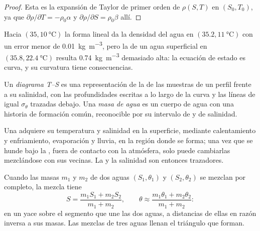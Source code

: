\begin{proof}
Esta es la expansión de Taylor de primer orden de $\rho(S, T)$ en $(S_0, T_0)$, ya que
$\partial\rho/\partial T = -\rho_0\alpha$ y $\partial\rho/\partial S =
\rho_0\beta$ allí.
\end{proof}

Hacia $(35, \qty{10}{\celsius})$ la forma lineal da la densidad del agua en $(35.2, \qty{11}{\celsius})$ con un error menor de \qty{0.01}{kg.m^{-3}}, pero la de un agua superficial en $(35.8, \qty{22.4}{\celsius})$ resulta \qty{0.74}{kg.m^{-3}} demasiado alta: la ecuación de estado es curva, y su curvatura tiene consecuencias.

\begin{definition}\label{def:b1:fluid-envelopes-structure:ts-diagram}
Un \emph{diagrama T--S} es una representación de la  de las muestras de un perfil frente a su salinidad, con las profundidades escritas a lo largo de la curva y las líneas de igual $\sigma_\theta$ trazadas debajo. Una \emph{masa de agua} es un cuerpo de agua con una historia de formación común, reconocible por su intervalo de  y de salinidad.
\end{definition}

Una  adquiere su temperatura y salinidad en la superficie, mediante calentamiento y enfriamiento, evaporación y lluvia, en la región donde se forma; una vez que se hunde bajo la , fuera de contacto con la atmósfera, solo puede cambiarlas mezclándose con sus vecinas. La  y la salinidad son entonces trazadores.

\begin{proposition}\label{prop:b1:fluid-envelopes-structure:mixing}
Cuando las masas $m_1$ y $m_2$ de dos aguas $(S_1, \theta_1)$ y $(S_2, \theta_2)$ se mezclan por completo, la mezcla tiene
\[
  S = \frac{m_1 S_1 + m_2 S_2}{m_1 + m_2},\qquad
  \theta \approx \frac{m_1 \theta_1 + m_2 \theta_2}{m_1 + m_2}:
\]
en un  yace sobre el segmento que une las dos aguas, a distancias de ellas en razón inversa a sus masas. Las mezclas de tres aguas llenan el triángulo que forman.
\end{proposition}

